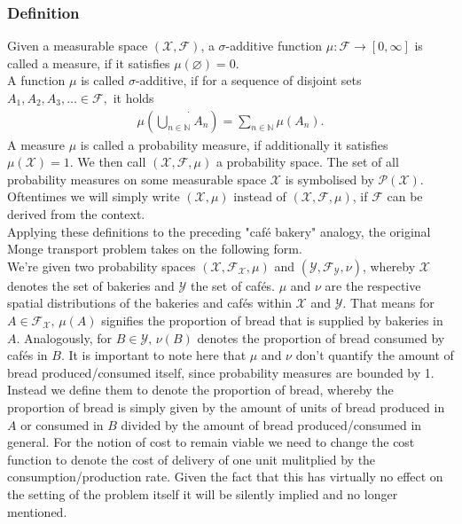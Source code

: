 \documentclass[11pt,a4paper]{article}
\begin{document}
\subsubsection{Definition}
Given a measurable space $(\mathcal{X,F})$, a $\sigma$-additive function $\mu{}:\mathcal{F}\rightarrow{}[0,\infty]$ is called a measure, if it satisfies $\mu(\varnothing)=0$.\\ A function $\mu$ is called $\sigma$-additive, if for a sequence of disjoint sets $A_1,A_2,A_3,\ldots\in\mathcal{F},$ it holds 
\begin{align*}
\mu(\dot{\bigcup\limits_{n\in\mathbb{N}}}A_n)=\sum\limits_{n\in\mathbb{N}}\mu(A_n).
\end{align*}
A measure $\mu$ is called a probability measure, if additionally it satisfies $\mu(\mathcal{X})=1$. We then call $(\mathcal{X},\mathcal{F},\mu)$ a probability space.
The set of all probability measures on some measurable space $\mathcal{X}$ is symbolised by $\mathcal{P(X)}$.\\
Oftentimes we will simply write $(\mathcal{X},\mu)$ instead of $(\mathcal{X},\mathcal{F},\mu)$, if $\mathcal{F}$ can be derived from the context.\vspace{1em}\\
Applying these definitions to the preceding "café bakery" analogy, the original Monge transport problem takes on the following form.\vspace{1em}\\ We're given two probability spaces $(\mathcal{X},\mathcal{F_X},\mu)$ and $(\mathcal{Y},\mathcal{F_Y},\nu)$, whereby $\mathcal{X}$ denotes the set of bakeries and $\mathcal{Y}$ the set of cafés. $\mu$ and $\nu$ are the respective spatial distributions of the bakeries and cafés within $\mathcal{X}$ and $\mathcal{Y}$. That means for $A\in\mathcal{F_X},\,\mu(A)$ signifies the proportion of bread that is supplied by bakeries in $A$. Analogously, for $B\in\mathcal{Y},\,\nu(B)$ denotes the proportion of bread consumed by cafés in $B$. It is important to note here that $\mu$ and $\nu$ don't quantify the amount of bread produced/consumed itself, since probability measures are bounded by 1. Instead we define them to denote the proportion of bread, whereby the proportion of bread is simply given by the amount of units of bread produced in $A$ or consumed in $B$ divided by the amount of bread produced/consumed in general. For the notion of cost to remain viable we need to change the cost function to denote the cost of delivery of one unit mulitplied by the consumption/production rate. Given the fact that this has virtually no effect on the setting of the problem itself it will be silently implied and no longer mentioned. \vspace{2em}\\
\end{document}
